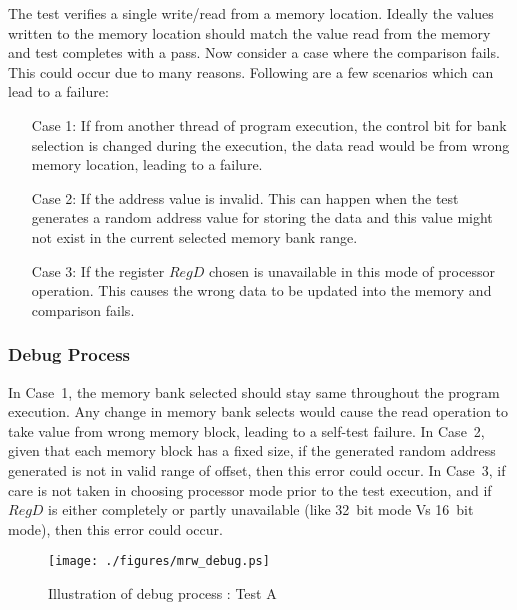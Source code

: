 The test verifies a single write/read from a memory location. Ideally the values written to the memory location should match the value read from the memory and test completes with a pass. Now consider a case where the comparison fails. This could occur due to many reasons. Following are a few scenarios which can lead to a failure:
\begin{itemize}
\item [Case 1:] If from another thread of program execution, the control bit for bank selection is changed during the execution, the data read would be from wrong memory location, leading to a failure. \label{mrw:case1}

\item [Case 2:] If the address value is invalid. This can happen when the test generates a random address value for storing the data and this value might not exist in the current selected memory bank range. \label{mrw:case2}

\item [Case 3:] If the register $Reg D$ chosen is unavailable in this mode of processor operation. This causes the wrong data to be updated into the memory and comparison fails. \label{mrw:case3}
\end{itemize}

\subsubsection{Debug Process}
In Case~1, the memory bank selected should stay same throughout the program execution. Any change in memory bank selects would cause the read operation to take value from wrong memory block, leading to a self-test failure. 
In Case~2, given that each memory block has a fixed size, if the generated random address generated is not in valid range of offset, then this error could occur. 
In Case~3, if care is not taken in choosing processor mode prior to the test execution, and if $Reg D$ is either completely or partly unavailable (like 32~bit mode Vs 16~bit mode), then this error could occur.

\begin{figure}[h]
\centering

\texttt{[image: ./figures/mrw\_debug.ps]}
\caption{Illustration of debug process : Test A} 
\label{fig:mrw_debug.ps}
\end{figure}

